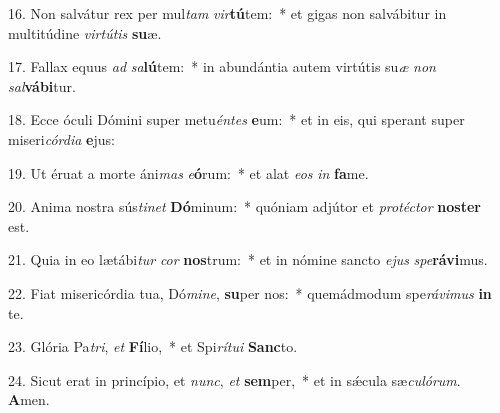 16. Non salvátur rex per mul\textit{tam} \textit{vir}\textbf{tú}tem:~*  et gigas non salvábitur in multitúdine \textit{vir}\textit{tú}\textit{tis} \textbf{su}æ.\

17. Fallax equus \textit{ad} \textit{sa}\textbf{lú}tem:~*  in abundántia autem virtútis su\textit{æ} \textit{non} \textit{sal}\textbf{vá}\textbf{bi}tur.\

18. Ecce óculi Dómini super metu\textit{én}\textit{tes} \textbf{e}um:~*  et in eis, qui sperant super miseri\textit{cór}\textit{di}\textit{a} \textbf{e}jus:\

19. Ut éruat a morte áni\textit{mas} \textit{e}\textbf{ó}rum:~*  et alat \textit{e}\textit{os} \textit{in} \textbf{fa}me.\

20. Anima nostra sús\textit{ti}\textit{net} \textbf{Dó}minum:~*  quóniam adjútor et \textit{pro}\textit{téc}\textit{tor} \textbf{nos}\textbf{ter} est.\

21. Quia in eo lætábi\textit{tur} \textit{cor} \textbf{nos}trum:~*  et in nómine sancto \textit{e}\textit{jus} \textit{spe}\textbf{rá}\textbf{vi}mus.\

22. Fiat misericórdia tua, Dó\textit{mi}\textit{ne}, \textbf{su}per nos:~*  quemádmodum spe\textit{rá}\textit{vi}\textit{mus} \textbf{in} te.\

23. Glória Pa\textit{tri}, \textit{et} \textbf{Fí}lio,~*  et Spi\textit{rí}\textit{tu}\textit{i} \textbf{Sanc}to.\

24. Sicut erat in princípio, et \textit{nunc}, \textit{et} \textbf{sem}per,~*  et in sǽcula sæ\textit{cu}\textit{ló}\textit{rum}. \textbf{A}men.\

